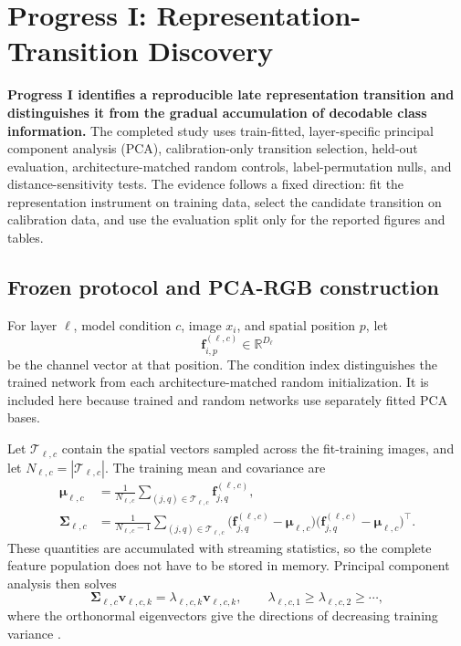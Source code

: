 \section{Progress I: Representation-Transition Discovery}\label{sec:pca-progress}

\textbf{Progress I identifies a reproducible late representation transition
and distinguishes it from the gradual accumulation of decodable class
information.} The completed study uses train-fitted, layer-specific principal
component analysis (PCA), calibration-only transition selection, held-out
evaluation, architecture-matched random controls, label-permutation nulls, and
distance-sensitivity tests. The evidence follows a fixed direction: fit the
representation instrument on training data, select the candidate transition on
calibration data, and use the evaluation split only for the reported figures
and tables.

\subsection{Frozen protocol and PCA-RGB construction}

For layer $\ell$, model condition $c$, image $x_i$, and spatial position
$p$, let
\begin{equation}
    \bm f^{(\ell,c)}_{i,p}\in\mathbb{R}^{D_\ell}
\end{equation}
be the channel vector at that position. The condition index distinguishes the
trained network from each architecture-matched random initialization. It is
included here because trained and random networks use separately fitted PCA
bases.

Let $\mathcal T_{\ell,c}$ contain the spatial vectors sampled across the
fit-training images, and let $N_{\ell,c}=|\mathcal T_{\ell,c}|$. The training
mean and covariance are
\begin{align}
    \bm\mu_{\ell,c}
    &=
    \frac{1}{N_{\ell,c}}
    \sum_{(j,q)\in\mathcal T_{\ell,c}}
    \bm f^{(\ell,c)}_{j,q},
    \label{eq:pca-training-mean}\\
    \bm\Sigma_{\ell,c}
    &=
    \frac{1}{N_{\ell,c}-1}
    \sum_{(j,q)\in\mathcal T_{\ell,c}}
    \bigl(\bm f^{(\ell,c)}_{j,q}-\bm\mu_{\ell,c}\bigr)
    \bigl(\bm f^{(\ell,c)}_{j,q}-\bm\mu_{\ell,c}\bigr)^\top .
    \label{eq:pca-training-covariance}
\end{align}
These quantities are accumulated with streaming statistics, so the complete
feature population does not have to be stored in memory. Principal component
analysis then solves
\begin{equation}
    \bm\Sigma_{\ell,c}\bm v_{\ell,c,k}
    =
    \lambda_{\ell,c,k}\bm v_{\ell,c,k},
    \qquad
    \lambda_{\ell,c,1}\geq\lambda_{\ell,c,2}\geq\cdots ,
    \label{eq:pca-eigendecomposition}
\end{equation}
where the orthonormal eigenvectors give the directions of decreasing training
variance \cite{pearson1901pca,hotelling1933pca}.

